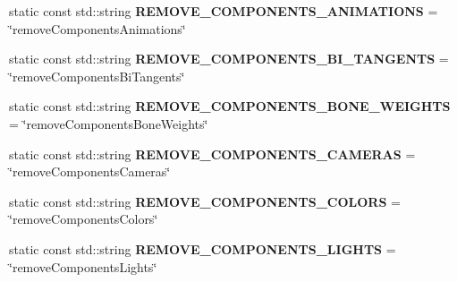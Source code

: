 \begin{DoxyCompactItemize}
\item 
\hypertarget{classrepo_1_1manipulator_1_1modelconvertor_1_1_model_import_config_a372589a7a74591e165fad2297908a75a}{}static const std\+::string {\bfseries R\+E\+M\+O\+V\+E\+\_\+\+C\+O\+M\+P\+O\+N\+E\+N\+T\+S\+\_\+\+A\+N\+I\+M\+A\+T\+I\+O\+N\+S} = \char`\"{}remove\+Components\+Animations\char`\"{}\label{classrepo_1_1manipulator_1_1modelconvertor_1_1_model_import_config_a372589a7a74591e165fad2297908a75a}

\item 
\hypertarget{classrepo_1_1manipulator_1_1modelconvertor_1_1_model_import_config_a727a1c9daa3261bb2e4493194d6b07f7}{}static const std\+::string {\bfseries R\+E\+M\+O\+V\+E\+\_\+\+C\+O\+M\+P\+O\+N\+E\+N\+T\+S\+\_\+\+B\+I\+\_\+\+T\+A\+N\+G\+E\+N\+T\+S} = \char`\"{}remove\+Components\+Bi\+Tangents\char`\"{}\label{classrepo_1_1manipulator_1_1modelconvertor_1_1_model_import_config_a727a1c9daa3261bb2e4493194d6b07f7}

\item 
\hypertarget{classrepo_1_1manipulator_1_1modelconvertor_1_1_model_import_config_a5cf1ba914153b6a2e1cf6f9816654e80}{}static const std\+::string {\bfseries R\+E\+M\+O\+V\+E\+\_\+\+C\+O\+M\+P\+O\+N\+E\+N\+T\+S\+\_\+\+B\+O\+N\+E\+\_\+\+W\+E\+I\+G\+H\+T\+S} = \char`\"{}remove\+Components\+Bone\+Weights\char`\"{}\label{classrepo_1_1manipulator_1_1modelconvertor_1_1_model_import_config_a5cf1ba914153b6a2e1cf6f9816654e80}

\item 
\hypertarget{classrepo_1_1manipulator_1_1modelconvertor_1_1_model_import_config_a2ca3bb5d8b7334fa159851473579bc83}{}static const std\+::string {\bfseries R\+E\+M\+O\+V\+E\+\_\+\+C\+O\+M\+P\+O\+N\+E\+N\+T\+S\+\_\+\+C\+A\+M\+E\+R\+A\+S} = \char`\"{}remove\+Components\+Cameras\char`\"{}\label{classrepo_1_1manipulator_1_1modelconvertor_1_1_model_import_config_a2ca3bb5d8b7334fa159851473579bc83}

\item 
\hypertarget{classrepo_1_1manipulator_1_1modelconvertor_1_1_model_import_config_a504471fe2255358d64ffa712bdb3f233}{}static const std\+::string {\bfseries R\+E\+M\+O\+V\+E\+\_\+\+C\+O\+M\+P\+O\+N\+E\+N\+T\+S\+\_\+\+C\+O\+L\+O\+R\+S} = \char`\"{}remove\+Components\+Colors\char`\"{}\label{classrepo_1_1manipulator_1_1modelconvertor_1_1_model_import_config_a504471fe2255358d64ffa712bdb3f233}

\item 
\hypertarget{classrepo_1_1manipulator_1_1modelconvertor_1_1_model_import_config_ad9e150b3cb05fe0e12ec25a2659e6ec2}{}static const std\+::string {\bfseries R\+E\+M\+O\+V\+E\+\_\+\+C\+O\+M\+P\+O\+N\+E\+N\+T\+S\+\_\+\+L\+I\+G\+H\+T\+S} = \char`\"{}remove\+Components\+Lights\char`\"{}\label{classrepo_1_1manipulator_1_1modelconvertor_1_1_model_import_config_ad9e150b3cb05fe0e12ec25a2659e6ec2}


\end{DoxyCompactItemize}

